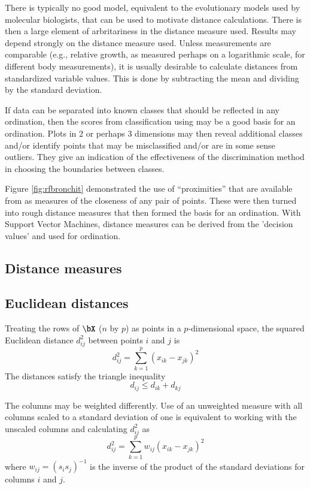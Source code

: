 There is typically no good model, equivalent
to the evolutionary models used by molecular biologists, that can be
used to motivate distance calculations.  There is then a large element
of arbritariness in the distance measure used.
Results may depend strongly on the distance measure used.  Unless
measurements are comparable (e.g., relative growth, as measured
perhaps on a logarithmic scale, for different body measurements), it
is usually desirable to calculate distances from standardized variable
values.  This is done by subtracting the mean and dividing by the
standard deviation.

If data can be separated into known classes that should be reflected
in any ordination, then the scores from classification using
 may be a good basis for an ordination. Plots in 2 or
perhaps 3 dimensions may then reveal additional classes and/or
identify points that may be misclassified and/or are in some sense
outliers.  They give an indication of the effectiveness of the
discrimination method in choosing the boundaries between classes.

Figure \ref{fig:rfbronchit} demonstrated the use of ``proximities''
that are available from  as measures of the
closeness of any pair of points.  These were then turned into rough
distance measures that then formed the basis for an ordination.  With
Support Vector Machines, distance measures can be derived from the
'decision values' and used for ordination.

\subsection{Distance measures}

\subsection*{Euclidean distances}

Treating the rows of $\bX$ ($n$ by $p$) as points in a $p$-dimensional
space, the squared Euclidean distance  $d_{ij}^2$ between points $i$ and $j$ is
\[
 d_{ij}^2 = \sum_{k=1}^p (x_{ik}-x_{jk})^2
\]
The distances satisfy the triangle inequality
\[ d_{ij} \le d_{ik} + d_{kj} \]

The columns may be weighted differently.
Use of an unweighted measure with all columns scaled to a standard
deviation of one is equivalent to working with the unscaled columns
and calculating $d_{ij}^2$ as
\[
d_{ij}^2 = \sum_{k=1}^p w_{ij} (x_{ik}-x_{jk})^2
\]
where $w_{ij} = (s_i s_j)^{-1}$ is the inverse of the product of
the standard deviations for columns $i$ and $j$.

